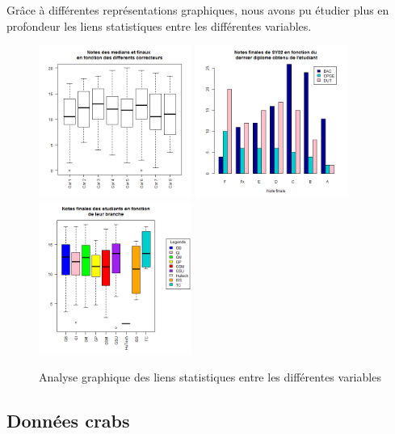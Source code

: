 \documentclass[titlepage]{article}
\begin{document}
\subsubsection{}
Grâce à différentes représentations graphiques, nous avons pu étudier plus en profondeur les liens statistiques entre les différentes variables.

\begin{figure}[H]
\label{fig1}
\begin{center}
\includegraphics[width=5cm]{correcteurs-notes.png}
\includegraphics[width=5cm]{diplome-notes.png}
\includegraphics[width=5cm]{branche-notes.png}
\end{center}
\caption{Analyse graphique des liens statistiques entre les différentes variables}
\end{figure}
\subsection{Données crabs}
\end{document}
